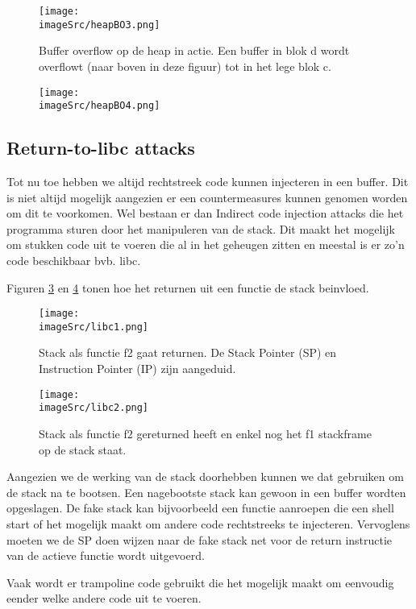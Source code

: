 \documentclass[../main.tex]{subfiles}
\begin{document}
\begin{figure}
\centering
\texttt{[image: \\imageSrc/heapBO3.png]}
\caption{Buffer overflow op de heap in actie. Een buffer in blok d wordt overflowt (naar boven in deze figuur) tot in het lege blok c.}
\label{f:heapBO3}
\end{figure}

\begin{figure}
\centering
\texttt{[image: \\imageSrc/heapBO4.png]}
\caption{}
\label{f:heapBO4}
\end{figure}
\subsection{Return-to-libc attacks}
Tot nu toe hebben we altijd rechtstreek code kunnen injecteren in een buffer.
Dit is niet altijd mogelijk aangezien er een countermeasures kunnen genomen worden om dit te voorkomen.
Wel bestaan er dan Indirect code injection attacks die het programma sturen door het manipuleren van de stack.
Dit maakt het mogelijk om stukken code uit te voeren die al in het geheugen zitten en meestal is er zo'n code beschikbaar bvb. libc.

Figuren \ref{f:libc1} en \ref{f:libc2} tonen hoe het returnen uit een functie de stack beinvloed.
\begin{figure}
\centering
\texttt{[image: \\imageSrc/libc1.png]}
\caption{Stack als functie f2 gaat returnen. De Stack Pointer (SP) en Instruction Pointer (IP) zijn aangeduid.}
\label{f:libc1}
\end{figure}

\begin{figure}
\centering
\texttt{[image: \\imageSrc/libc2.png]}
\caption{Stack als functie f2 gereturned heeft en enkel nog het f1 stackframe op de stack staat.}
\label{f:libc2}
\end{figure}

Aangezien we de werking van de stack doorhebben kunnen we dat gebruiken om de stack na te bootsen.
Een nagebootste stack kan gewoon in een buffer wordten opgeslagen.
De fake stack kan bijvoorbeeld een functie aanroepen die een shell start of het mogelijk maakt om andere code rechtstreeks te injecteren.
Vervoglens moeten we de SP doen wijzen naar de fake stack net voor de return instructie van de actieve functie wordt uitgevoerd.

Vaak wordt er trampoline code gebruikt die het mogelijk maakt om eenvoudig eender welke andere code uit te voeren.
\end{document}
